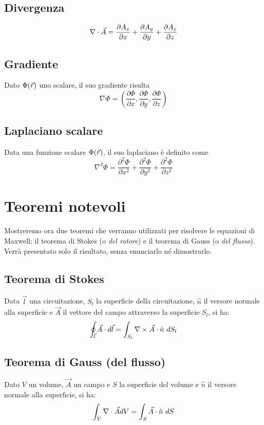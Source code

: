\subsection{Divergenza}
\begin{equation}
  \nabla\cdot \vec{A} = \frac{\partial A_x}{\partial x} + \frac{\partial A_y}{\partial y} + \frac{\partial A_z}{\partial z}
\end{equation}
\subsection{Gradiente}
Dato $\Phi(\vec{r})$ uno scalare, il suo gradiente risulta
\begin{equation}
  \nabla \Phi = \left(\frac{\partial \Phi}{\partial x} , \frac{\partial \Phi}{\partial y}, \frac{\partial \Phi}{\partial z}\right)
\end{equation}
\subsection{Laplaciano scalare}
Data una funzione scalare $\Phi(\vec{r})$, il suo laplaciano è definito come
\begin{equation}
  \nabla^2 \Phi = \frac{\partial^2 \Phi}{\partial x^2} + \frac{\partial^2 \Phi}{\partial y^2} + \frac{\partial^2 \Phi}{\partial z^2}
\end{equation}

\section{Teoremi notevoli}
Mostreremo ora due teoremi che verranno utilizzati per risolvere le equazioni di Maxwell: il teorema di Stokes (o \emph{del rotore}) e il teorema di Gauss (o \emph{del flusso}).
Verrà presentato solo il risultato, senza enunciarlo né dimostrarlo.
\subsection{Teorema di Stokes}
Data $\vec{l}$ una circuitazione, $S_l$ la superficie della circuitazione, $\hat{n}$ il versore normale alla superficie  e $\vec{A}$ il vettore del campo attraverso la superficie $S_l$, si ha:
\begin{equation}
  \oint_{\vec{l}} \vec{A} \cdot d\vec{l} = \int_{S_l}\nabla\times \vec{A} \cdot \hat{n}~ d S_l
\end{equation}

\subsection{Teorema di Gauss (del flusso)}
Dato $V$ un volume, $\vec{A}$ un campo e $S$ la superficie del volume e $\hat{n}$
il versore normale alla superficie, si ha:
\begin{equation}
  \int_V \nabla\cdot \vec{A} dV = \int_S \vec{A}\cdot \hat{n} ~ dS
\end{equation}


